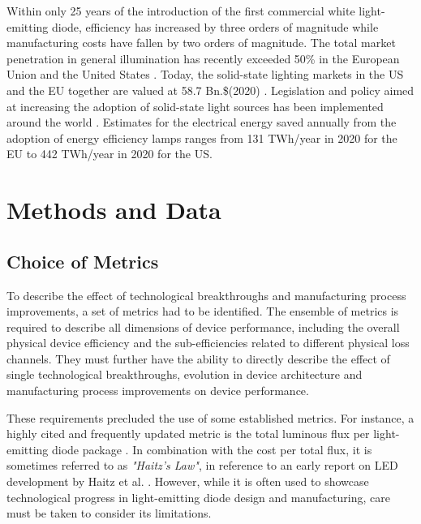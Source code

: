 \documentclass[a4paper,nocompress]{spie}  %
\begin{document}
    Within only 25 years of the introduction of the first commercial white light-emitting diode, efficiency has increased by three orders of magnitude while manufacturing costs have fallen by two orders of magnitude. The total market penetration in general illumination has recently exceeded 50\% in the European Union and the United States \cite{eu2019impactass}\cite{stratunl2018}. Today, the solid-state lighting markets in the US and the EU together are valued at 58.7 Bn.\$(2020) \cite{gvr2020market_us}\cite{gvr2020market_eu}. Legislation and policy aimed at increasing the adoption of solid-state light sources has been implemented around the world \cite{2009-125-EC_regulation-2012_impact}. Estimates for the electrical energy saved annually from the adoption of energy efficiency lamps ranges from 131 TWh/year in 2020 for the EU to 442 TWh/year in 2020 for the US.


\clearpage
\section{Methods and Data}
\label{sec:methods}

\subsection{Choice of Metrics}

    To describe the effect of technological breakthroughs and manufacturing process improvements, a set of metrics had to be identified. The ensemble of metrics is required to describe all dimensions of device performance, including the overall physical device efficiency and the sub-efficiencies related to different physical loss channels. They must further have the ability to directly describe the effect of single technological breakthroughs, evolution in device architecture and manufacturing process improvements on device performance.
    
    These requirements precluded the use of some established metrics. For instance, a highly cited and frequently updated metric is the total luminous flux per light-emitting diode package \cite{Liu2009,haitz2011solid,cho2017white,Fontoynont2018}. In combination with the cost per total flux, it is sometimes referred to as \textit{"Haitz's Law"}, in reference to an early report on LED development by Haitz et al. \cite{haitz1999case}. However, while it is often used to showcase technological progress in light-emitting diode design and manufacturing, care must be taken to consider its limitations.
    
\end{document}
